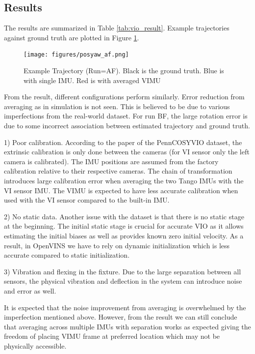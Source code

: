 \documentclass[conference]{IEEEtran}
\begin{document}
\subsection{Results}

The results are summarized in Table \ref{tab:vio_result}. Example trajectories against ground truth are plotted in Figure \ref{fig:posyaw_af}.

\begin{figure}
    \centering
    \texttt{[image: figures/posyaw\_af.png]}
    \caption{Example Trajectory (Run=AF). Black is the ground truth. Blue is with single IMU. Red is with averaged VIMU}
    \label{fig:posyaw_af}
\end{figure}

From the result, different configurations perform similarly. Error reduction from averaging as in simulation is not seen. This is believed to be due to various imperfections from the real-world dataset. For run BF, the large rotation error is due to some incorrect association between estimated trajectory and ground truth.

1) Poor calibration. According to the paper of the PennCOSYVIO dataset, the extrinsic calibration is only done between the cameras (for VI sensor only the left camera is calibrated). The IMU positions are assumed from the factory calibration relative to their respective cameras. The chain of transformation introduces large calibration error when averaging the two Tango IMUs with the VI sensor IMU. The VIMU is expected to have less accurate calibration when used with the VI sensor compared to the  built-in IMU.

2) No static data. Another issue with the dataset is that there is no static stage at the beginning. The initial static stage is crucial for accurate VIO as it allows estimating the initial biases as well as provides known zero initial velocity. As a result, in OpenVINS we have to rely on dynamic initialization which is less accurate compared to static initialization.

3) Vibration and flexing in the fixture. Due to the large separation between all sensors, the physical vibration and deflection in the system can introduce noise and error as well.

It is expected that the noise improvement from averaging is overwhelmed by the imperfection mentioned above. However, from the result we can still conclude that averaging across multiple IMUs with separation works as expected giving the freedom of placing VIMU frame at preferred location which may not be physically accessible.
\end{document}
